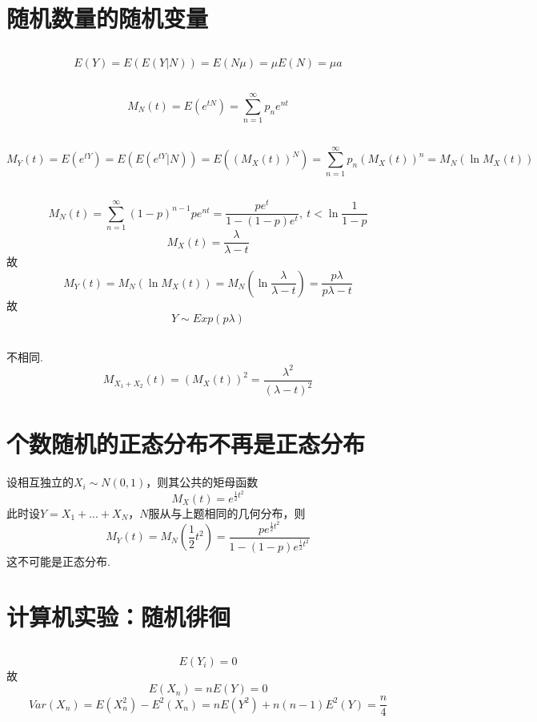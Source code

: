 \documentclass{article}
\begin{document}
\begin{CJK}{UTF8}{gbsn}
\section{随机数量的随机变量}
\subsection{}
$$ E(Y)=E(E(Y|N))=E(N\mu)=\mu E(N)=\mu a $$
\subsection{}
$$ M_{N}(t)=E(e^{tN})=\sum\limits_{n=1}^{\infty}p_{n}e^{nt}$$
\subsection{}
$$M_{Y}(t)=E(e^{tY})=E(E(e^{tY}|N))=E((M_{X}(t))^{N})=\sum\limits_{n=1}^{\infty}p_{n}(M_{X}(t))^{n}=M_{N}(\ln M_{X}(t))$$
\subsection{}
$$M_{N}(t)=\sum\limits_{n=1}^{\infty}(1-p)^{n-1}pe^{nt}=\frac{pe^{t}}{1-(1-p)e^{t}},\ t<\ln\frac{1}{1-p}$$
$$M_{X}(t)=\frac{\lambda}{\lambda-t}$$
故
$$M_{Y}(t)=M_{N}(\ln M_{X}(t))=M_{N}(\ln\frac{\lambda}{\lambda-t})=\frac{p\lambda}{p\lambda-t}$$
故
$$ Y\sim Exp(p\lambda)$$
\subsection{}
不相同.
$$ M_{X_{1}+X_{2}}(t)=(M_{X}(t))^{2}=\frac{\lambda^{2}}{(\lambda-t)^{2}}$$
\section{个数随机的正态分布不再是正态分布}
设相互独立的$X_{i}\sim N(0,1)$，则其公共的矩母函数
$$ M_{X}(t)=e^{\frac{1}{2}t^{2}}$$
此时设$Y=X_{1}+...+X_{N}$，$N$服从与上题相同的几何分布，则
$$ M_{Y}(t)=M_{N}(\frac{1}{2}t^{2})=\frac{pe^{\frac{1}{2}t^{2}}}{1-(1-p)e^{\frac{1}{2}t^{2}}}$$
这不可能是正态分布.
\section{计算机实验：随机徘徊}
\subsection{}
$$ E(Y_{i})=0$$
故
$$ E(X_{n})=nE(Y)=0$$
$$ Var(X_{n})=E(X_{n}^{2})-E^{2}(X_{n}) =nE(Y^{2})+n(n-1)E^{2}(Y)=\frac{n}{4}$$

\end{CJK}
\end{document}
